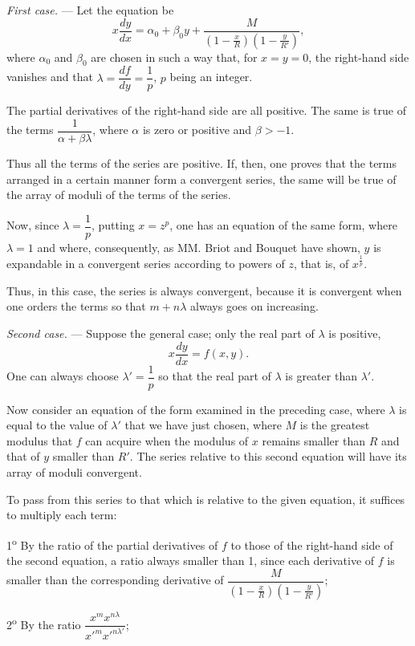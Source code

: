 \documentclass[11pt]{article}
\begin{document}
\emph{First case.} — Let the equation be
\[
x\frac{dy}{dx}=\alpha_0+\beta_0y+\frac{M}{\left(1-\frac{x}{R}\right)\left(1-\frac{y}{R'}\right)},
\]
where $\alpha_0$ and $\beta_0$ are chosen in such a way that, for $x=y=0$, the right-hand side vanishes and that $\lambda=\dfrac{df}{dy}=\dfrac1p$, $p$ being an integer.

The partial derivatives of the right-hand side are all positive. The same is true of the terms $\dfrac{1}{\alpha+\beta\lambda}$, where $\alpha$ is zero or positive and $\beta>-1$.

Thus all the terms of the series are positive. If, then, one proves that the terms arranged in a certain manner form a convergent series, the same will be true of the array of moduli of the terms of the series.

Now, since $\lambda=\dfrac1p$, putting $x=z^p$, one has an equation of the same form, where $\lambda=1$ and where, consequently, as MM. Briot and Bouquet have shown, $y$ is expandable in a convergent series according to powers of $z$, that is, of $x^{\frac1p}$.

Thus, in this case, the series is always convergent, because it is convergent when one orders the terms so that $m+n\lambda$ always goes on increasing.

\emph{Second case.} — Suppose the general case; only the real part of $\lambda$ is positive,
\[
x\frac{dy}{dx}=f(x,y).
\]
One can always choose $\lambda'=\dfrac1p$ so that the real part of $\lambda$ is greater than $\lambda'$.

Now consider an equation of the form examined in the preceding case, where $\lambda$ is equal to the value of $\lambda'$ that we have just chosen, where $M$ is the greatest modulus that $f$ can acquire when the modulus of $x$ remains smaller than $R$ and that of $y$ smaller than $R'$. The series relative to this second equation will have its array of moduli convergent.

To pass from this series to that which is relative to the given equation, it suffices to multiply each term:

1\textsuperscript{o} By the ratio of the partial derivatives of $f$ to those of the right-hand side of the second equation, a ratio always smaller than 1, since each derivative of $f$ is smaller than the corresponding derivative of $\dfrac{M}{\left(1-\frac{x}{R}\right)\left(1-\frac{y}{R'}\right)}$;

2\textsuperscript{o} By the ratio $\dfrac{x^m x^{n\lambda}}{x'^m x'^{n\lambda'}}$;
\end{document}
